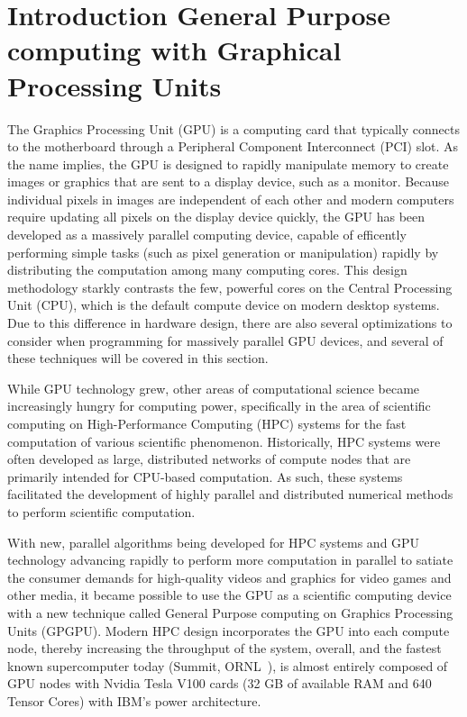 \chapter{Introduction General Purpose computing with Graphical Processing Units}
\label{ch:gpu}

The Graphics Processing Unit (GPU) is a computing card that typically connects to the motherboard through a Peripheral Component Interconnect (PCI) slot.
As the name implies, the GPU is designed to rapidly manipulate memory to create images or graphics that are sent to a display device, such as a monitor.
Because individual pixels in images are independent of each other and modern computers require updating all pixels on the display device quickly, the GPU has been developed as a massively parallel computing device, capable of efficently performing simple tasks (such as pixel generation or manipulation) rapidly by distributing the computation among many computing cores.
This design methodology starkly contrasts the few, powerful cores on the Central Processing Unit (CPU), which is the default compute device on modern desktop systems.
Due to this difference in hardware design, there are also several optimizations to consider when programming for massively parallel GPU devices, and several of these techniques will be covered in this section.

While GPU technology grew, other areas of computational science became increasingly hungry for computing power, specifically in the area of scientific computing on High-Performance Computing (HPC) systems for the fast computation of various scientific phenomenon.
Historically, HPC systems were often developed as large, distributed networks of compute nodes that are primarily intended for CPU-based computation.
As such, these systems facilitated the development of highly parallel and distributed numerical methods to perform scientific computation.

With new, parallel algorithms being developed for HPC systems and GPU technology advancing rapidly to perform more computation in parallel to satiate the consumer demands for high-quality videos and graphics for video games and other media, it became possible to use the GPU as a scientific computing device with a new technique called General Purpose computing on Graphics Processing Units (GPGPU).
Modern HPC design incorporates the GPU into each compute node, thereby increasing the throughput of the system, overall, and the fastest known supercomputer today (Summit, ORNL~\cite{kahle2019}), is almost entirely composed of GPU nodes with Nvidia Tesla V100 cards (32 GB of available RAM and 640 Tensor Cores) with IBM's power architecture.


